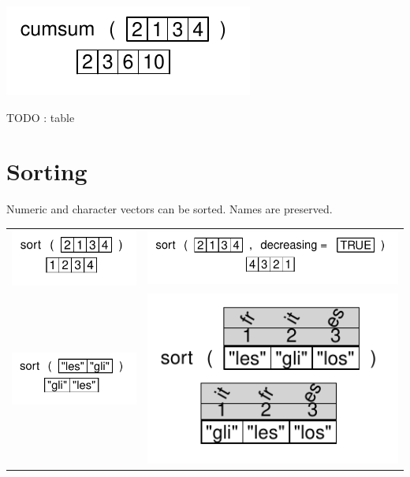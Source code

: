 \documentclass[pdflatex]{article}
\begin{document}
\includegraphics{cumsum}

TODO : table

\section{Sorting}

Numeric and character vectors can be sorted. Names are preserved.

\begin{tabular}{cc}
\includegraphics{sort} & \includegraphics{sort2}\\
\includegraphics{sort_char} & \includegraphics{sort_char_names} \\
\end{tabular}
\end{document}
